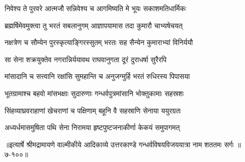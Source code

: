 \twolineshloka
{निवेश्य ते पुरवरे आत्मजौ सन्निवेश्य च}
{आगमिष्यति मे भूयः सकाशमतिधार्मिकः} %

\twolineshloka
{ब्रह्मर्षिमेवमुक्त्वा तु भरतं सबलानुगम्}
{आज्ञापयामास तदा कुमारौ चाभ्यषेचयत्} %

\twolineshloka
{नक्षत्रेण च सौम्येन पुरस्कृत्याङ्गिरस्सुतम्}
{भरतः सह सैन्येन कुमाराभ्यां विनिर्ययौ} %

\twolineshloka
{सा सेना शक्रयुक्तेव नगरान्निर्ययावथ}
{राघवानुगता दूरं दुराधर्षा सुरैरपि} %

\twolineshloka
{मांसादानि च सत्त्वानि रक्षांसि सुमहान्ति च}
{अनुजग्मुर्हि भरतं रुधिरस्य पिपासया} %

\twolineshloka
{भूतग्रामाश्च बहवो मांसभक्षाः सुदारुणाः}
{गन्धर्वपुत्रमांसानि भोक्तुकामाः सहस्रशः} %

\twolineshloka
{सिंहव्याघ्रवराहाणां खेचराणां च पक्षिणाम्}
{बहूनि वै सहस्राणि सेनाया ययुरग्रतः} %

\twolineshloka
{अध्यर्धमासमुषिता पथि सेना निरामया}
{हृष्टपुष्टजनाकीर्णा केकयं समुपागमत्} %


॥इत्यार्षे श्रीमद्रामायणे वाल्मीकीये आदिकाव्ये उत्तरकाण्डे गन्धर्वविषयविजययात्रा नाम शततमः सर्गः ॥७-१००॥
